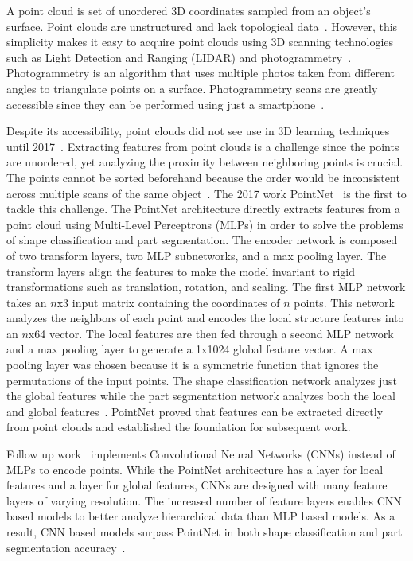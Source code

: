 A point cloud is set of unordered 3D coordinates sampled from an object's surface. Point clouds are unstructured and lack topological data~\cite{Xiao2020}. However, this simplicity makes it easy to acquire point clouds using 3D scanning technologies such as Light Detection and Ranging (LIDAR) and photogrammetry~\cite{Leberl2010}. Photogrammetry is an algorithm that uses multiple photos taken from different angles to triangulate points on a surface. Photogrammetry scans are greatly accessible since they can be performed using just a smartphone~\cite{Micheletti2015}.

Despite its accessibility, point clouds did not see use in 3D learning techniques until 2017~\cite{Xiao2020}. Extracting features from point clouds is a challenge since the points are unordered, yet analyzing the proximity between neighboring points is crucial. The points cannot be sorted beforehand because the order would be inconsistent across multiple scans of the same object~\cite{Qi2017}. The 2017 work PointNet~\cite{Qi2017} is the first to tackle this challenge. The PointNet architecture directly extracts features from a point cloud using Multi-Level Perceptrons (MLPs) in order to solve the problems of shape classification and part segmentation. The encoder network is composed of two transform layers, two MLP subnetworks, and a max pooling layer. The transform layers align the features to make the model invariant to rigid transformations such as translation, rotation, and scaling. The first MLP network takes an $n$x3 input matrix containing the coordinates of $n$ points. This network analyzes the neighbors of each point and encodes the local structure features into an $n$x64 vector. The local features are then fed through a second MLP network and a max pooling layer to generate a 1x1024 global feature vector. A max pooling layer was chosen because it is a symmetric function that ignores the permutations of the input points. The shape classification network analyzes just the global features while the part segmentation network analyzes both the local and global features~\cite{Qi2017}. PointNet proved that features can be extracted directly from point clouds and established the foundation for subsequent work.

Follow up work~\cite{Xu2018, Li2018, Wu2019} implements Convolutional Neural Networks (CNNs) instead of MLPs to encode points. While the PointNet architecture has a layer for local features and a layer for global features, CNNs are designed with many feature layers of varying resolution. The increased number of feature layers enables CNN based models to better analyze hierarchical data than MLP based models. As a result, CNN based models surpass PointNet in both shape classification and part segmentation accuracy~\cite{Wu2019}.

